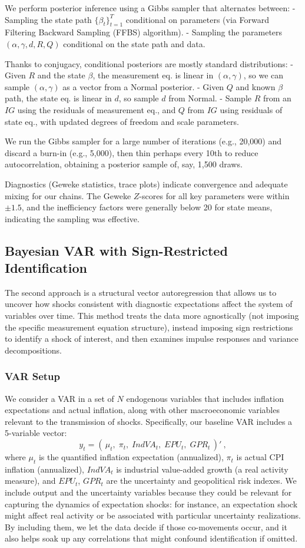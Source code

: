\documentclass[12pt]{article}
\begin{document}
We perform posterior inference using a Gibbs sampler that alternates between:
- Sampling the state path $\{\beta_t\}_{t=1}^T$ conditional on parameters (via Forward Filtering Backward Sampling (FFBS) algorithm).
- Sampling the parameters $(\alpha,\gamma,d,R,Q)$ conditional on the state path and data.

Thanks to conjugacy, conditional posteriors are mostly standard distributions:
- Given $R$ and the state $\beta$, the measurement eq. is linear in $(\alpha,\gamma)$, so we can sample $(\alpha,\gamma)$ as a vector from a Normal posterior.
- Given $Q$ and known $\beta$ path, the state eq. is linear in $d$, so sample $d$ from Normal.
- Sample $R$ from an $IG$ using the residuals of measurement eq., and $Q$ from $IG$ using residuals of state eq., with updated degrees of freedom and scale parameters.

We run the Gibbs sampler for a large number of iterations (e.g., 20,000) and discard a burn-in (e.g., 5,000), then thin perhaps every 10th to reduce autocorrelation, obtaining a posterior sample of, say, 1,500 draws.

Diagnostics (Geweke statistics, trace plots) indicate convergence and adequate mixing for our chains. The Geweke $Z$-scores for all key parameters were within $\pm 1.5$, and the inefficiency factors were generally below 20 for state means, indicating the sampling was effective.

\subsection{Bayesian VAR with Sign-Restricted Identification}\label{sec:method_bvar}
The second approach is a structural vector autoregression that allows us to uncover how shocks consistent with diagnostic expectations affect the system of variables over time. This method treats the data more agnostically (not imposing the specific measurement equation structure), instead imposing sign restrictions to identify a shock of interest, and then examines impulse responses and variance decompositions.

\subsubsection{VAR Setup}
We consider a VAR in a set of $N$ endogenous variables that includes inflation expectations and actual inflation, along with other macroeconomic variables relevant to the transmission of shocks. Specifically, our baseline VAR includes a 5-variable vector:
\[
    y_t = (\, \mu_t,\; \pi_t,\; IndVA_t,\; EPU_t,\; GPR_t \,)'~,
\]
where $\mu_t$ is the quantified inflation expectation (annualized), $\pi_t$ is actual CPI inflation (annualized), $IndVA_t$ is industrial value-added growth (a real activity measure), and $EPU_t$, $GPR_t$ are the uncertainty and geopolitical risk indexes. We include output and the uncertainty variables because they could be relevant for capturing the dynamics of expectation shocks: for instance, an expectation shock might affect real activity or be associated with particular uncertainty realizations. By including them, we let the data decide if those co-movements occur, and it also helps soak up any correlations that might confound identification if omitted.
\end{document}
